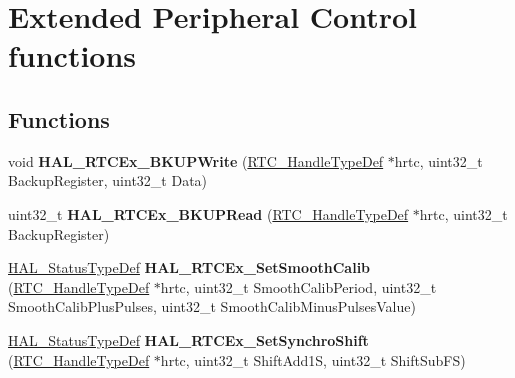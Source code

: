\hypertarget{group___r_t_c_ex___exported___functions___group3}{}\section{Extended Peripheral Control functions}
\label{group___r_t_c_ex___exported___functions___group3}
\subsection*{Functions}
\begin{DoxyCompactItemize}
\item 
\mbox{\label{group___r_t_c_ex___exported___functions___group3_gafb908a2f254ccff959c31ac70e957de4}} 
void {\bfseries H\+A\+L\+\_\+\+R\+T\+C\+Ex\+\_\+\+B\+K\+U\+P\+Write} (\hyperlink{struct_r_t_c___handle_type_def}{R\+T\+C\+\_\+\+Handle\+Type\+Def} $\ast$hrtc, uint32\+\_\+t Backup\+Register, uint32\+\_\+t Data)
\item 
\mbox{\label{group___r_t_c_ex___exported___functions___group3_ga37ba612da141a2b443bf64210f981513}} 
uint32\+\_\+t {\bfseries H\+A\+L\+\_\+\+R\+T\+C\+Ex\+\_\+\+B\+K\+U\+P\+Read} (\hyperlink{struct_r_t_c___handle_type_def}{R\+T\+C\+\_\+\+Handle\+Type\+Def} $\ast$hrtc, uint32\+\_\+t Backup\+Register)
\item 
\mbox{\label{group___r_t_c_ex___exported___functions___group3_ga46034902700cb75a4dfbc5c1cd48cae9}} 
\hyperlink{stm32f0xx__hal__def_8h_a63c0679d1cb8b8c684fbb0632743478f}{H\+A\+L\+\_\+\+Status\+Type\+Def} {\bfseries H\+A\+L\+\_\+\+R\+T\+C\+Ex\+\_\+\+Set\+Smooth\+Calib} (\hyperlink{struct_r_t_c___handle_type_def}{R\+T\+C\+\_\+\+Handle\+Type\+Def} $\ast$hrtc, uint32\+\_\+t Smooth\+Calib\+Period, uint32\+\_\+t Smooth\+Calib\+Plus\+Pulses, uint32\+\_\+t Smooth\+Calib\+Minus\+Pulses\+Value)
\item 
\mbox{\label{group___r_t_c_ex___exported___functions___group3_ga07344e3d0f7e9f569ec02d4a75d158dc}} 
\hyperlink{stm32f0xx__hal__def_8h_a63c0679d1cb8b8c684fbb0632743478f}{H\+A\+L\+\_\+\+Status\+Type\+Def} {\bfseries H\+A\+L\+\_\+\+R\+T\+C\+Ex\+\_\+\+Set\+Synchro\+Shift} (\hyperlink{struct_r_t_c___handle_type_def}{R\+T\+C\+\_\+\+Handle\+Type\+Def} $\ast$hrtc, uint32\+\_\+t Shift\+Add1S, uint32\+\_\+t Shift\+Sub\+FS)

\end{DoxyCompactItemize}
